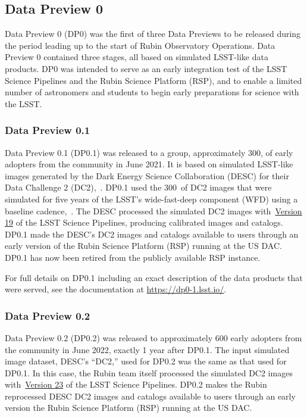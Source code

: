 \subsection{Data Preview 0}
\label{sec:dp0}

Data Preview 0 (DP0) was the first of three Data Previews to be released during the period leading up to the start of Rubin Observatory Operations.
Data Preview 0 contained three stages, all based on simulated LSST-like data products.
DP0 was intended to serve as an early integration test of the LSST Science Pipelines and the Rubin Science Platform (RSP), and to enable a limited number of astronomers and students to begin early preparations for science with the LSST.



\subsubsection{Data Preview 0.1}
\label{sec:dp01}

Data Preview 0.1 (DP0.1) was released to a group, approximately 300,  of early adopters from the community in June 2021.
It is based on simulated LSST-like images generated by the Dark Energy Science Collaboration (DESC) for their Data Challenge 2 (DC2),~\citep{2021ApJS..253...31L}.
DP0.1 used the 300~\sqdeg of DC2 images that were simulated for five years of the LSST’s wide-fast-deep component (WFD) using a baseline cadence,~.
The DESC processed the simulated DC2 images with~\href{https://pipelines.lsst.io/v/v19_0_0/index.html}{Version 19} of the LSST Science Pipelines, producing calibrated images and catalogs.
DP0.1 made the DESC’s DC2 images and catalogs available to users through an early version of the Rubin Science Platform (RSP) running at the US DAC.
DP0.1 has now been retired from the publicly available RSP instance.

For full details on DP0.1 including an exact description of the data products that were served, see the documentation at \url{https://dp0-1.lsst.io/}.

\subsubsection{Data Preview 0.2}
\label{sec:dp02}

Data Preview 0.2 (DP0.2) was released to approximately 600 early adopters from the community in June 2022, exactly 1 year after DP0.1.
The input simulated image dataset, DESC's ``DC2,'' used for DP0.2 was the same as that used for DP0.1.
In this case, the Rubin team itself processed the simulated DC2 images with~\href{https://pipelines.lsst.io/v/v23_0_0/index.html}{Version 23} of the LSST Science Pipelines.
DP0.2 makes the Rubin reprocessed DESC DC2 images and catalogs available to users through an early version the Rubin Science Platform (RSP) running at the US DAC.

